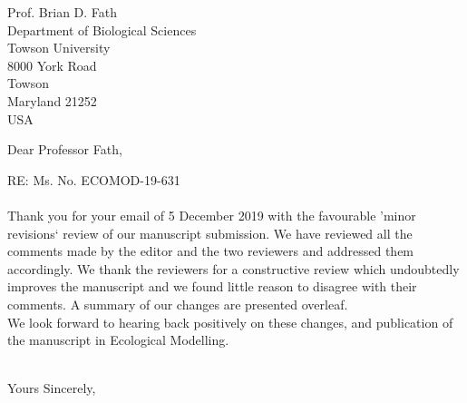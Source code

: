 \documentclass[10pt]{letter}
\begin{document}
\begin{large}

\begin{letter}{Prof. Brian D. Fath \\ Department of Biological Sciences \\
		Towson University \\ 8000 York Road \\ Towson \\ Maryland 21252 \\ USA}
\opening{Dear Professor Fath,}

RE: Ms. No. ECOMOD-19-631 \\
\\
Thank you for your email of 5 December 2019 with the favourable 'minor
revisions` review of our manuscript submission. We have reviewed all the
comments made by the editor and the two reviewers and addressed them
accordingly. We thank the reviewers for a constructive review which undoubtedly
improves the manuscript and we found little reason to disagree with their
comments. A summary of our changes are presented overleaf.  \\

We look forward to hearing back positively on these changes, and publication of
the manuscript in Ecological Modelling. \\
\\

\closing{Yours Sincerely,} 

\end{letter} 

\end{large}

\newpage
\end{document}
